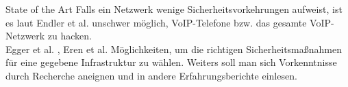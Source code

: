 \begin{section}{State of the Art}
	\DIFaddend Falls ein Netzwerk wenige Sicherheitsvorkehrungen aufweist, ist es laut Endler et al. 
	\cite{endler:2006:hacking} unschwer möglich, VoIP-Telefone bzw. das gesamte VoIP-Netzwerk zu hacken.
	 \\
	Egger et al. \DIFaddbegin \cite{Egger:2008:linVoip}\DIFaddend , Eren et al. \DIFdelbegin {}%
\DIFdel{,}%
\DIFdel{,}\DIFdelend \DIFaddbegin \cite{eren:2007:voip} \DIFaddend \cite{porter:2006:practicalvoip} \DIFaddbegin {}\DIFaddend Möglichkeiten, um die richtigen 
	Sicherheitsmaßnahmen für eine gegebene Infrastruktur zu wählen. 
	Weiters soll man sich Vorkenntnisse durch Recherche aneignen und in andere Erfahrungsberichte einlesen. \\
\DIFdelbegin %

\DIFdelend %
\end{section}
\pagebreak
